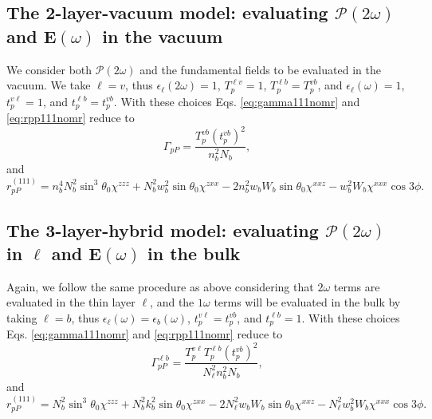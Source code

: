 
\subsection{The 2-layer-vacuum model: evaluating
\texorpdfstring{$\boldsymbol{\mathcal{P}}(2\omega)$}{P(2w)} and
\texorpdfstring{$\mathbf{E}(\omega)$}{E(w)} in the vacuum}
\label{sec:2-layer-vacuum}

We consider both $\boldsymbol{\mathcal{P}}(2\omega)$ and the fundamental fields
to be evaluated in the vacuum. We take $\ell = v$, thus
$\epsilon_{\ell}(2\omega) = 1$, $T^{\ell v}_{p} = 1$, $T^{\ell b}_{p} =
T^{vb}_{p}$, and $\epsilon_{\ell}(\omega) = 1$, $t^{v\ell}_{p} = 1$, and
$t^{\ell b}_{p} = t^{vb}_{p}$. With these choices Eqs. \eqref{eq:gamma111nomr}
and \eqref{eq:rpp111nomr} reduce to
\begin{equation}
\Gamma_{pP} =
\frac{T^{v b}_{p}\left(t^{v b}_{p}\right)^{2}}{n^{2}_{b}N_{b}},
\end{equation}
and
\begin{equation}
r^{(111)}_{pP} =
  n^{4}_{b}N^{2}_{b}\sin^{3}\theta_{0}\chi^{zzz}
+ N^{2}_{b}w^{2}_{b}\sin\theta_{0}\chi^{zxx}
- 2n^{2}_{b}w_{b}W_{b}\sin\theta_{0}\chi^{xxz}
- w^{2}_{b}W_{b}\chi^{xxx}\cos3\phi.
\end{equation}



\subsection{The 3-layer-hybrid model: evaluating
\texorpdfstring{$\boldsymbol{\mathcal{P}}(2\omega)$ in $\ell$}{P(2w) in l} and
\texorpdfstring{$\mathbf{E}(\omega)$}{E(w)} in the bulk}
\label{sec:3-layer-hybrid}

Again, we follow the same procedure as above considering that $2\omega$ terms
are evaluated in the thin layer $\ell$, and the $1\omega$ terms will be
evaluated in the bulk by taking $\ell = b$, thus $\epsilon_{\ell}(\omega) =
\epsilon_{b}(\omega)$, $t^{v\ell}_{p} = t^{vb}_{p}$, and $t^{\ell b}_{p} = 1$.
With these choices Eqs. \eqref{eq:gamma111nomr} and \eqref{eq:rpp111nomr} reduce
to
\begin{equation}
\Gamma^{\ell b}_{pP}=
\frac{T^{v\ell}_{p}T^{\ell b}_{p}\left(t^{vb}_{p}\right)^{2}}
  {N^{2}_{\ell}n^{2}_{b}N_{b}},
\end{equation}
and
\begin{equation}
r^{(111)}_{pP} = 
  N^{2}_{b}\sin^{3}\theta_{0}\chi^{zzz}
+ N^{2}_{b}k^{2}_{b}\sin\theta_{0}\chi^{zxx}
- 2N^{2}_{\ell}w_{b}W_{b}\sin\theta_{0}\chi^{xxz}
- N^{2}_{\ell}w^{2}_{b}W_{b}\chi^{xxx}\cos3\phi.
\end{equation}


